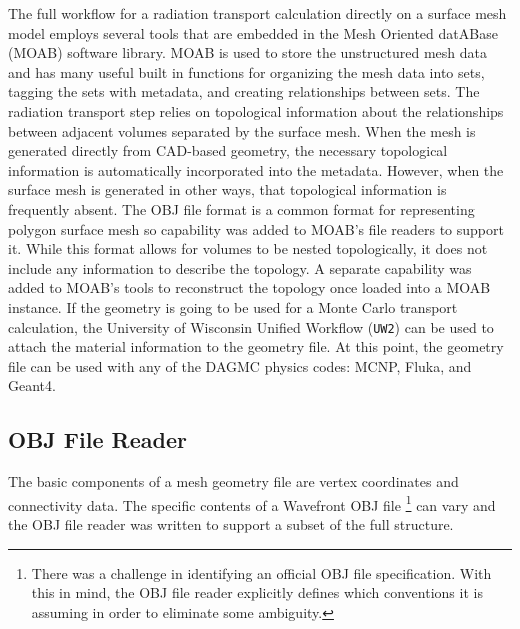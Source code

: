 \documentclass{anstrans}
\begin{document}
The full workflow for a radiation transport calculation directly on a surface mesh model
employs several tools that are embedded in the Mesh Oriented datABase (MOAB) software library\cite{moab}.
MOAB is used to store the unstructured mesh data 
and has many useful built in functions for organizing the mesh data into sets, 
tagging the sets with metadata, and creating relationships between sets.  The radiation transport step relies 
on topological information about the relationships between adjacent volumes separated by the surface mesh.
When the mesh is generated directly from CAD-based geometry, the necessary topological information
is automatically incorporated into the metadata.  However, when the surface mesh is generated in other
ways, that topological information is frequently absent.  The OBJ file format\cite{obj} is a common format for
representing polygon surface mesh so capability was
added to MOAB's file readers to support it.  While this format allows for volumes to be
nested topologically, it does not include any information to describe the topology.  A separate capability
was added to MOAB's tools to reconstruct the topology once loaded into a MOAB instance.
If the geometry is going to be used 
for a Monte Carlo transport calculation, the University of Wisconsin Unified Workflow (\texttt{UW2}) can be used to attach 
the material information to the geometry file.  At this point, the geometry file
can be used with any of the DAGMC physics codes: MCNP, Fluka, and Geant4.

\subsection{OBJ File Reader}
The basic components of a mesh geometry file are vertex coordinates and connectivity data.
The specific contents of a Wavefront OBJ file \footnote{There was a challenge in identifying an official OBJ file specification.  
With this in mind, the OBJ file reader explicitly defines which conventions it is assuming in order to eliminate some ambiguity.}
can vary and the OBJ file reader was written to support a subset of the full structure. 
\end{document}
